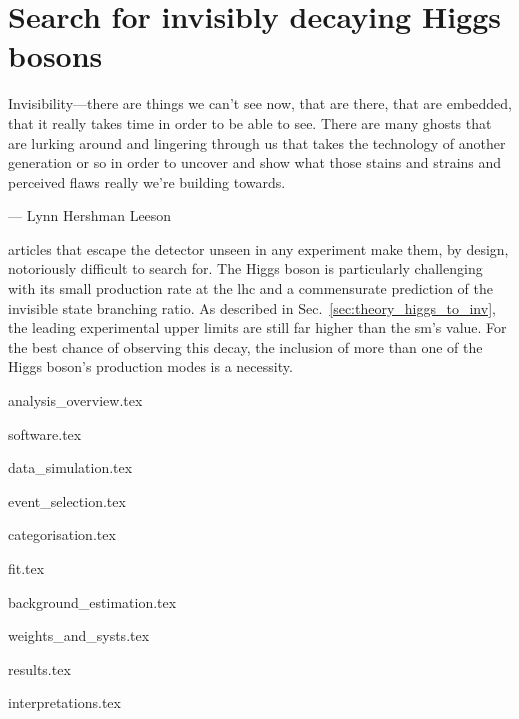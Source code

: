 \chapter{Search for invisibly decaying Higgs bosons}
\label{chap:higgstoinv}

\epigraph{Invisibility---there are things we can't see now, that are there, that are embedded, that it really takes time in order to be able to see. There are many ghosts that are lurking around and lingering through us that takes the technology of another generation or so in order to uncover and show what those stains and strains and perceived flaws really we're building towards.}{--- Lynn Hershman Leeson}

articles that escape the detector unseen in any experiment make them, by design, notoriously difficult to search for. The Higgs boson is particularly challenging with its small production rate at the \acrshort{lhc} and a commensurate prediction of the invisible state branching ratio. As described in Sec.~\ref{sec:theory_higgs_to_inv}, the leading experimental upper limits are still far higher than the \acrlong{sm}'s value. For the best chance of observing this decay, the inclusion of more than one of the Higgs boson's production modes is a necessity.




{analysis_overview.tex}




{software.tex}




{data_simulation.tex}




{event_selection.tex}




{categorisation.tex}




{fit.tex}




{background_estimation.tex}




{weights_and_systs.tex}




{results.tex}




{interpretations.tex}
